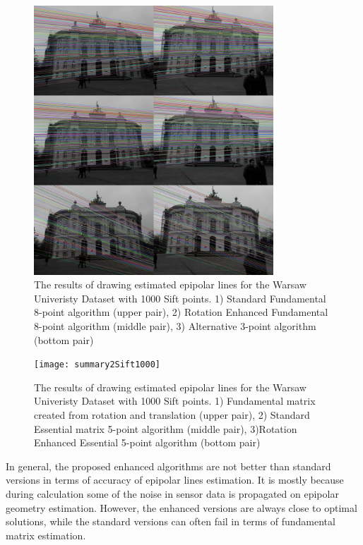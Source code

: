 \begin{figure}[b!]
    \centering
    \includegraphics[width=0.8\textwidth]{summary1Sift1000}
    \caption{The results of drawing estimated epipolar lines for the Warsaw Univeristy Dataset with 1000 Sift points. 1) Standard Fundamental 8-point algorithm (upper pair), 2) Rotation Enhanced Fundamental 8-point algorithm (middle pair), 3) Alternative 3-point algorithm (bottom pair) }
    \label{fig:SummaryEpiLines11000}
\end{figure}
\begin{figure}[ht!]
    \centering
    \texttt{[image: summary2Sift1000]}
    \caption{The results of drawing estimated epipolar lines for the Warsaw Univeristy Dataset with 1000 Sift points. 1) Fundamental matrix created from rotation and translation (upper pair), 2) Standard Essential matrix 5-point algorithm (middle pair), 3)Rotation Enhanced Essential 5-point algorithm (bottom pair) }
    \label{fig:SummaryEpiLines21000}
\end{figure}
In general, the proposed enhanced algorithms are not better than standard versions in terms of accuracy of epipolar lines estimation. It is mostly because during calculation some of the noise in sensor data is propagated on epipolar geometry estimation. However, the enhanced versions are always close to optimal solutions, while the standard versions can often fail in terms of fundamental matrix estimation.
\clearpage

